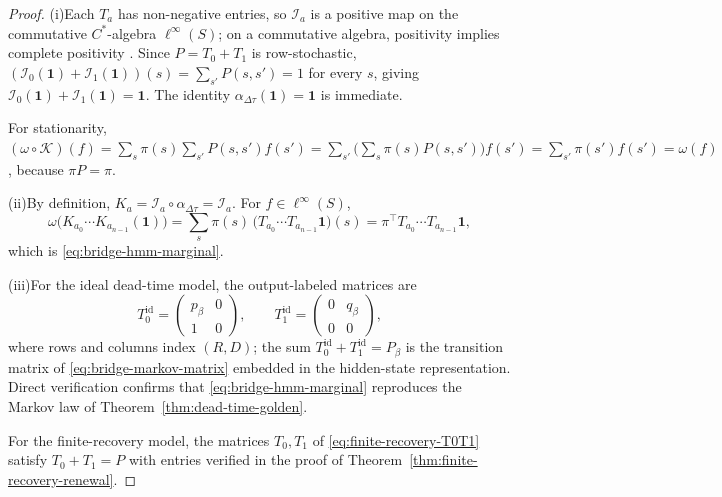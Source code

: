 \begin{proof}
(i)\enspace Each $T_a$ has non-negative entries, so $\mathcal I_a$ is a positive map on the commutative $C^*$-algebra $\ell^\infty(S)$; on a commutative algebra, positivity implies complete positivity \cite{Davies1976}. Since $P=T_0+T_1$ is row-stochastic, $(\mathcal I_0(\mathbf 1)+\mathcal I_1(\mathbf 1))(s)=\sum_{s'}P(s,s')=1$ for every $s$, giving $\mathcal I_0(\mathbf 1)+\mathcal I_1(\mathbf 1)=\mathbf 1$. The identity $\alpha_{\Delta\tau}(\mathbf 1)=\mathbf 1$ is immediate.

For stationarity, $(\omega\circ\mathcal K)(f)=\sum_s\pi(s)\sum_{s'}P(s,s')f(s')=\sum_{s'}\bigl(\sum_s\pi(s)P(s,s')\bigr)f(s')=\sum_{s'}\pi(s')f(s')=\omega(f)$, because $\pi P=\pi$.

(ii)\enspace By definition, $K_a=\mathcal I_a\circ\alpha_{\Delta\tau}=\mathcal I_a$. For $f\in\ell^\infty(S)$,
\[
\omega\bigl(K_{a_0}\cdots K_{a_{n-1}}(\mathbf 1)\bigr)
=
\sum_s \pi(s)\,\bigl(T_{a_0}\cdots T_{a_{n-1}}\mathbf 1\bigr)(s)
=
\pi^\top T_{a_0}\cdots T_{a_{n-1}}\mathbf 1,
\]
which is \eqref{eq:bridge-hmm-marginal}.

(iii)\enspace For the ideal dead-time model, the output-labeled matrices are
\[
T_0^{\mathrm{id}}=
\begin{pmatrix}p_\beta&0\\1&0\end{pmatrix},
\qquad
T_1^{\mathrm{id}}=
\begin{pmatrix}0&q_\beta\\0&0\end{pmatrix},
\]
where rows and columns index $(R,D)$; the sum $T_0^{\mathrm{id}}+T_1^{\mathrm{id}}=P_\beta$ is the transition matrix of \eqref{eq:bridge-markov-matrix} embedded in the hidden-state representation. Direct verification confirms that \eqref{eq:bridge-hmm-marginal} reproduces the Markov law of Theorem~\ref{thm:dead-time-golden}.

For the finite-recovery model, the matrices $T_0,T_1$ of \eqref{eq:finite-recovery-T0T1} satisfy $T_0+T_1=P$ with entries verified in the proof of Theorem~\ref{thm:finite-recovery-renewal}.
\end{proof}
